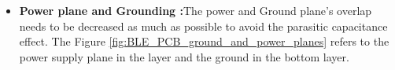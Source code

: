
\begin{itemize}
	\item {\textbf{Power plane and Grounding :}}The power and Ground plane's overlap needs to be decreased as much as possible to avoid the parasitic capacitance effect. The Figure \ref{fig:BLE_PCB_ground_and_power_planes} refers to the power supply plane in the layer and the ground in the bottom layer.
		\begin{itemize}
			\noindent
			\begin{figure}[h]
				\centering
				\qquad

\end{figure}
\end{itemize}
\end{itemize}
